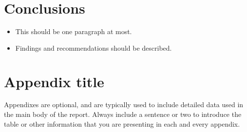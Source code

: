 \documentclass{bcrre_lab_report}
\begin{document}
\section{Conclusions}
\begin{itemize}
    \item This should be one paragraph at most. 
    \item Findings and recommendations should be described.
\end{itemize}

\printbibliography

\appendix
\section{Appendix title}
Appendixes are optional, and are typically used to include detailed data used in the main body of the report.  Always include a sentence or two to introduce the table or other information that you are presenting in each and every appendix. 
\end{document}
